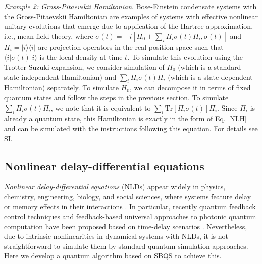 \documentclass[aps,pra,twocolumn,floatfix,groupedaddress,superscriptaddress,nofootinbib,notitlepage]{revtex4-2}
\begin{document}
\textit{Example 2: Gross-Pitaevskii Hamiltonian}. Bose-Einstein condensate systems with the Gross-Pitaevskii Hamiltonian are examples of systems with effective nonlinear unitary evolutions that emerge due to application of the Hartree approximation, i.e., mean-field theory, where $\dot{\sigma}(t) = -i [H_{0}+\sum_{i} \Pi_{i} \sigma(t) \Pi_{i} ,\sigma(t)]$ and $\Pi_{i}=|i\rangle\langle i|$ are projection operators in the real position space such that $\langle i| \sigma(t) |i\rangle$ is the local density at time $t$. To simulate this evolution using the Trotter-Suzuki expansion, we consider simulation of $H_{0}$ (which is a standard state-independent Hamiltonian) and $\sum_{i} \Pi_{i} \sigma(t) \Pi_{i}$ (which is a state-dependent Hamiltonian) separately. To simulate $H_{0}$, we can decompose it in terms of fixed quantum states and follow the steps in the previous section. To simulate $\sum_{i} \Pi_{i} \sigma(t) \Pi_{i}$, we note that it is equivalent to $\sum_{i} \mathrm{Tr}[\Pi_{i} \sigma(t)] \Pi_{i}$. Since $\Pi_{i} $ is already a quantum state, this Hamiltonian is exactly in the form of Eq. \eqref{NLH} and can be simulated with the instructions following this equation. For details see SI.

\subsection{Nonlinear delay-differential equations}

\textit{Nonlinear delay-differential equations} (NLDs) appear widely in physics, chemistry, engineering, biology, and social sciences, where systems feature delay or memory effects in their interactions \cite{ref:NLD}. In particular, recently quantum feedback control techniques and feedback-based universal approaches to photonic quantum computation have been proposed based on time-delay scenarios \cite{ref:NLD-2}. Nevertheless, due to intrinsic nonlinearities in dynamical systems with NLDs, it is not straightforward to simulate them by standard quantum simulation approaches. Here we develop a quantum algorithm based on SBQS to achieve this. 
\end{document}
